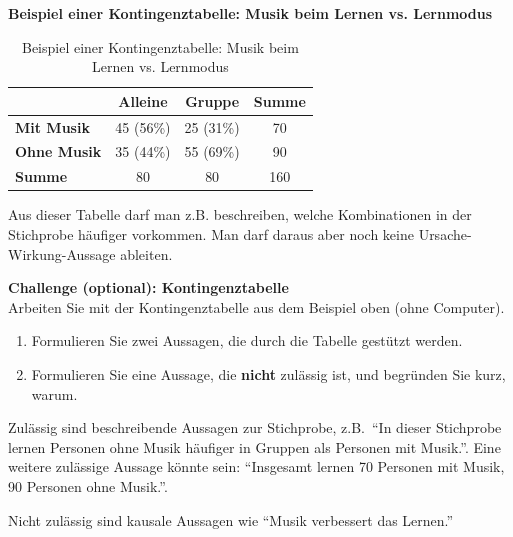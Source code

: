 \begin{myexample}
	\textbf{Beispiel einer Kontingenztabelle: Musik beim Lernen vs. Lernmodus}

	\begin{table}[H]
		\centering
		\begin{tabular}{l c c c}
			\toprule
			                    & \textbf{Alleine} & \textbf{Gruppe} & \textbf{Summe} \\
			\midrule
			\textbf{Mit Musik}  & 45 (56\%)        & 25 (31\%)       & 70             \\
			\textbf{Ohne Musik} & 35 (44\%)        & 55 (69\%)       & 90             \\
			\textbf{Summe}      & 80               & 80              & 160            \\
			\bottomrule
		\end{tabular}
		\caption{Beispiel einer Kontingenztabelle: Musik beim Lernen vs. Lernmodus}
		\label{table:kontingenztabelle}
	\end{table}

	Aus dieser Tabelle darf man z.B. beschreiben, welche Kombinationen in der Stichprobe häufiger vorkommen. Man darf daraus aber noch keine Ursache-Wirkung-Aussage ableiten.
\end{myexample}

\begin{mychallenge}\label{mychallenge:kontingenztabelle}
	\textbf{Challenge (optional): Kontingenztabelle} \\
	Arbeiten Sie mit der Kontingenztabelle aus dem Beispiel oben (ohne Computer).
	\begin{enumerate}
		\item Formulieren Sie zwei Aussagen, die durch die Tabelle gestützt werden.
		\item Formulieren Sie eine Aussage, die \textbf{nicht} zulässig ist, und begründen Sie kurz, warum.
	\end{enumerate}

	\begin{myanswer}
		Zulässig sind beschreibende Aussagen zur Stichprobe, z.B.\ ``In dieser Stichprobe lernen Personen ohne Musik häufiger in Gruppen als Personen mit Musik.''. Eine weitere zulässige Aussage könnte sein: ``Insgesamt lernen 70 Personen mit Musik, 90 Personen ohne Musik.''.

		Nicht zulässig sind kausale Aussagen wie ``Musik verbessert das Lernen.''
	\end{myanswer}
\end{mychallenge}

